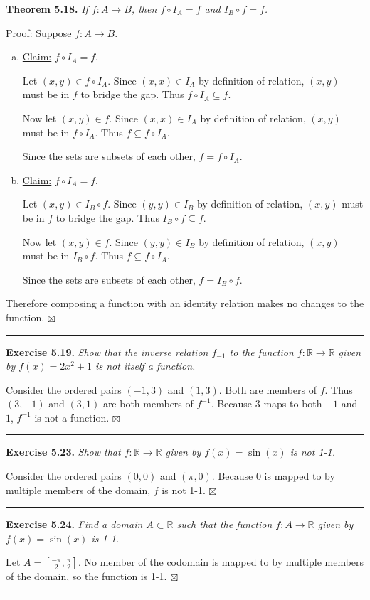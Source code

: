 \documentclass[a4paper,12pt]{article}
\newcommand{\entry}[3]
{
   \noindent\textbf{#1.}
   \emph{#2}
   \bigskip

   \noindent#3
   \bigskip
   \hrule
   \vspace{24pt}
}
\newcommand{\reals}{\mathbb{R}}
\newcommand{\sig}{$\boxtimes$}
\begin{document}
\entry{Theorem 5.18}
{If $f : A \to B$, then $f \circ I_A = f$ and $I_B \circ f = f$.}
{
\underline{Proof:} Suppose $f : A \to B$.
\begin{enumerate}[(a)]
\item
\underline{Claim:} $f \circ I_A = f$.

Let $(x, y) \in f \circ I_A$. Since $(x, x) \in I_A$ by definition of relation, $(x, y)$ must be in $f$ to bridge the gap. Thus $f \circ I_A \subseteq f$.

Now let $(x, y) \in f$. Since $(x, x) \in I_A$ by definition of relation, $(x, y)$ must be in $f \circ I_A$. Thus $f \subseteq f \circ I_A$.

Since the sets are subsets of each other, $f = f \circ I_A$.

\item
\underline{Claim:} $f \circ I_A = f$.

Let $(x, y) \in I_B \circ f$. Since $(y, y) \in I_B$ by definition of relation, $(x, y)$ must be in $f$ to bridge the gap. Thus $I_B \circ f \subseteq f$.

Now let $(x, y) \in f$. Since $(y, y) \in I_B$ by definition of relation, $(x, y)$ must be in $I_B \circ f$. Thus $f \subseteq f \circ I_A$.

Since the sets are subsets of each other, $f = I_B \circ f$.
\end{enumerate}
Therefore composing a function with an identity relation makes no changes to the function. \sig
}



\entry{Exercise 5.19}
{Show that the inverse relation $f_{-1}$ to the function $f : \reals \to \reals$ given by $f(x) = 2x^2 + 1$ is not itself a function.}
{
Consider the ordered pairs $(-1, 3)$ and $(1, 3)$. Both are members of $f$. Thus $(3, -1)$ and $(3, 1)$ are both members of $f^{-1}$. Because $3$ maps to both $-1$ and $1$, $f^{-1}$ is not a function. \sig
}



\entry{Exercise 5.23}
{Show that $f : \reals \to \reals$ given by $f(x) = \sin(x)$ is not 1-1.}
{
Consider the ordered pairs $(0, 0)$ and $(\pi, 0)$. Because $0$ is mapped to by multiple members of the domain, $f$ is not 1-1. \sig
}



\entry{Exercise 5.24}
{Find a domain $A \subset \reals$ such that the function $f : A \to \reals$ given by $f(x) = \sin(x)$ is 1-1.}
{
Let $A = [\frac{-\pi}{2}, \frac{\pi}{2}]$. No member of the codomain is mapped to by multiple members of the domain, so the function is 1-1. \sig
}
\end{document}
